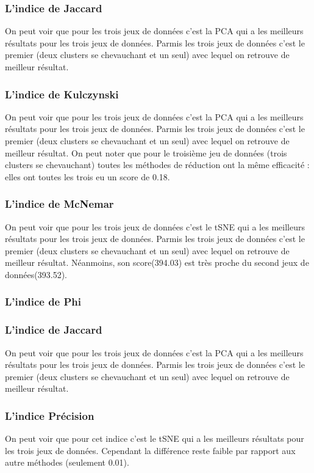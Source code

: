 \subsubsection{L'indice de Jaccard}
On peut voir que pour les trois jeux de données c'est la PCA qui a les meilleurs résultats pour les trois jeux de données.
Parmis les trois jeux de données c'est le premier (deux clusters se chevauchant et un seul) avec lequel on retrouve de meilleur résultat.

\subsubsection{L'indice de Kulczynski}
On peut voir que pour les trois jeux de données c'est la PCA qui a les meilleurs résultats pour les trois jeux de données.
Parmis les trois jeux de données c'est le premier (deux clusters se chevauchant et un seul) avec lequel on retrouve de meilleur résultat.
On peut noter que pour le troisième jeu de données (trois clusters se chevauchant) toutes les méthodes de réduction ont la même efficacité : 
elles ont toutes les trois eu un score de 0.18.


\subsubsection{L'indice de McNemar}
On peut voir que pour les trois jeux de données c'est le tSNE qui a les meilleurs résultats pour les trois jeux de données.
Parmis les trois jeux de données c'est le premier (deux clusters se chevauchant et un seul) avec lequel on retrouve de meilleur résultat.
Néanmoins, son score(394.03) est très proche du second jeux de données(393.52).

\subsubsection{L'indice de Phi}

\subsubsection{L'indice de Jaccard}
On peut voir que pour les trois jeux de données c'est la PCA qui a les meilleurs résultats pour les trois jeux de données.
Parmis les trois jeux de données c'est le premier (deux clusters se chevauchant et un seul) avec lequel on retrouve de meilleur résultat.

\subsubsection{L'indice Précision}
On peut voir que pour cet indice c'est le tSNE qui a les meilleurs résultats pour les trois jeux de données.
Cependant la différence reste faible par rapport aux autre méthodes (seulement 0.01).

